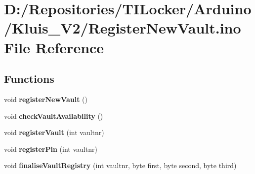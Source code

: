\hypertarget{_register_new_vault_8ino}{}\section{D\+:/\+Repositories/\+T\+I\+Locker/\+Arduino/\+Kluis\+\_\+\+V2/\+Register\+New\+Vault.ino File Reference}
\label{_register_new_vault_8ino}
\subsection*{Functions}
\begin{DoxyCompactItemize}
\item 
\mbox{\label{_register_new_vault_8ino_a6e2a918eaf574a53c6d417608dc95e5e}} 
void {\bfseries register\+New\+Vault} ()
\item 
\mbox{\label{_register_new_vault_8ino_a89369080b9686c23044062ba94b54d8b}} 
void {\bfseries check\+Vault\+Availability} ()
\item 
\mbox{\label{_register_new_vault_8ino_aa613a036fc2a4f9292f96a1b3c5bffdf}} 
void {\bfseries register\+Vault} (int vaultnr)
\item 
\mbox{\label{_register_new_vault_8ino_a9302406552a7afd8297d4a2d88ef0b91}} 
void {\bfseries register\+Pin} (int vaultnr)
\item 
\mbox{\label{_register_new_vault_8ino_ab7eb0f8da34260e2f4b654d27e02f9a8}} 
void {\bfseries finalise\+Vault\+Registry} (int vaultnr, byte first, byte second, byte third)
\end{DoxyCompactItemize}
